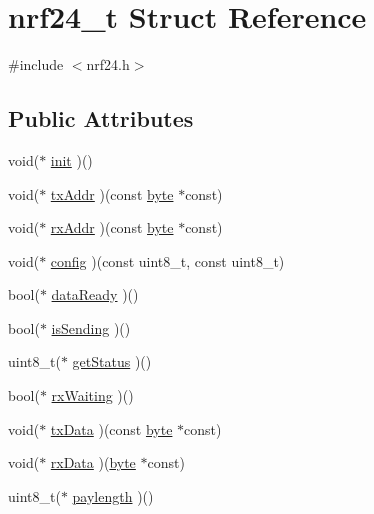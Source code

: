 \hypertarget{structnrf24__t}{}\section{nrf24\+\_\+t Struct Reference}
\label{structnrf24__t}


{\ttfamily \#include $<$nrf24.\+h$>$}

\subsection*{Public Attributes}
\begin{DoxyCompactItemize}
\item 
void($\ast$ \hyperlink{structnrf24__t_a1b0228efa4dec38bb902bf988e905fd4}{init} )()
\item 
void($\ast$ \hyperlink{structnrf24__t_abfc805d8cb41f8a3bf611a76a5d830db}{tx\+Addr} )(const \hyperlink{examples_2Nrf24_2Rx_2src_2cavrn_8h_ab8ef12fab634c171394422d0ee8baf94}{byte} $\ast$const)
\item 
void($\ast$ \hyperlink{structnrf24__t_acf773cd1e2f2c5c0ce507320f9b7a45f}{rx\+Addr} )(const \hyperlink{examples_2Nrf24_2Rx_2src_2cavrn_8h_ab8ef12fab634c171394422d0ee8baf94}{byte} $\ast$const)
\item 
void($\ast$ \hyperlink{structnrf24__t_a84a2a68d2e139d5d1f12b26f1883f401}{config} )(const uint8\+\_\+t, const uint8\+\_\+t)
\item 
bool($\ast$ \hyperlink{structnrf24__t_ae3ba9b440dc852e8ef9ddc43304f3228}{data\+Ready} )()
\item 
bool($\ast$ \hyperlink{structnrf24__t_a187270f5a397a1425c860f06f1c946ba}{is\+Sending} )()
\item 
uint8\+\_\+t($\ast$ \hyperlink{structnrf24__t_ad0896af4e3e40a15bd991aec48769cd4}{get\+Status} )()
\item 
bool($\ast$ \hyperlink{structnrf24__t_a55d42334a0c98fdf58b7125c843d1370}{rx\+Waiting} )()
\item 
void($\ast$ \hyperlink{structnrf24__t_a1dbfdf83bc96820d8a24cb7a34f58ef8}{tx\+Data} )(const \hyperlink{examples_2Nrf24_2Rx_2src_2cavrn_8h_ab8ef12fab634c171394422d0ee8baf94}{byte} $\ast$const)
\item 
void($\ast$ \hyperlink{structnrf24__t_a8d5ef96e697b56dcf24469366ebf2e58}{rx\+Data} )(\hyperlink{examples_2Nrf24_2Rx_2src_2cavrn_8h_ab8ef12fab634c171394422d0ee8baf94}{byte} $\ast$const)
\item 
uint8\+\_\+t($\ast$ \hyperlink{structnrf24__t_ad8cd539e47d8d842d9877d1ae8d55097}{paylength} )()

\end{DoxyCompactItemize}
